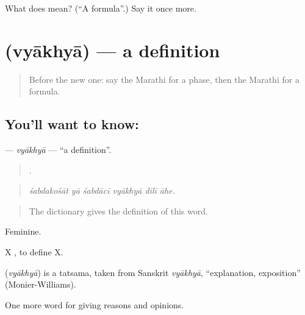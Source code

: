 \begin{tcolorbox}[breakable,colback=teal!4,colframe=teal!35!black,title={Before you move on}]
What does  mean? (\textquotedblleft{}A formula\textquotedblright{}.) Say it once more.
\end{tcolorbox}
\section[\texorpdfstring{\mr{व्याख्या} (vyākhyā)}{व्याख्या (vyākhyā)}]{ (vyākhyā) — a definition}

\label{lesson:MR-C374-vyakhya}



\begin{quote}
Before the new one: say the Marathi for a phase, then the Marathi for a formula.
\end{quote}

\subsection*{You'll want to know: }
\textbf{} — \emph{vyākhyā} — \textquotedblleft{}a definition\textquotedblright{}.

\begin{quote}
     .
\end{quote}

\begin{quote}
\emph{śabdakośāt yā śabdācī vyākhyā dilī āhe.}
\end{quote}

\begin{quote}
The dictionary gives the definition of this word.
\end{quote}

Feminine.

X   , to define X.

\begin{cousinweb}
\textbf{} (\emph{vyākhyā}) is a tatsama, taken from Sanskrit \emph{vyākhyā}, \textquotedblleft{}explanation, exposition\textquotedblright{} (Monier-Williams).
\end{cousinweb}

\begin{grammarlens}[title={What you've built}]
One more word for giving reasons and opinions.
\end{grammarlens}

